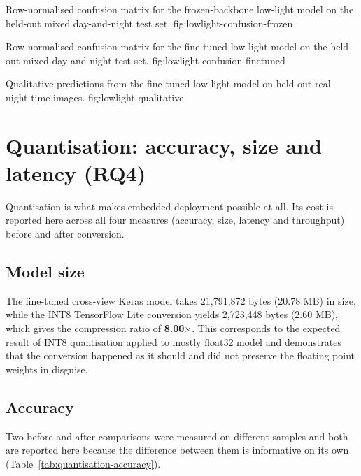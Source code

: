 {Row-normalised confusion matrix for the frozen-backbone low-light model on the held-out mixed day-and-night test set.}
{fig:lowlight-confusion-frozen}

{Row-normalised confusion matrix for the fine-tuned low-light model on the held-out mixed day-and-night test set.}
{fig:lowlight-confusion-finetuned}

\FloatBarrier

{Qualitative predictions from the fine-tuned low-light model on held-out real night-time images.}
{fig:lowlight-qualitative}

\FloatBarrier

\section{Quantisation: accuracy, size and latency (RQ4)}
\label{sec:qr-quantisation}

Quantisation is what makes embedded deployment possible at all. Its cost is reported here across all four measures (accuracy, size, latency and throughput) before and after conversion.

\subsection{Model size}

The fine-tuned cross-view Keras model takes 21,791,872 bytes (20.78 MB) in size, while the INT8 TensorFlow Lite conversion yields 2,723,448 bytes (2.60 MB), which gives the compression ratio of \textbf{8.00$\times$}. This corresponds to the expected result of INT8 quantisation applied to mostly float32 model and demonstrates that the conversion happened as it should and did not preserve the floating point weights in disguise.

\subsection{Accuracy}

Two before-and-after comparisons were measured on different samples and both are reported here because the difference between them is informative on its own (Table~\ref{tab:quantisation-accuracy}).

